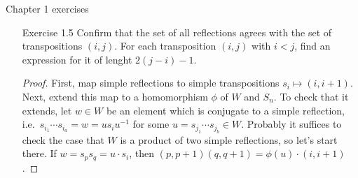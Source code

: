 
Chapter 1 exercises

\begin{enumerate}
    \item[Exercise 1.5] Confirm that the set of all reflections agrees with the set of transpositions $(i,j)$. For each transposition $(i,j)$ with $i<j$, find an expression for it of lenght $2(j-i) - 1$.
    
    \begin{proof}
    First, map simple reflections to simple transpositions $s_i \mapsto (i,i+1)$. 
    Next, extend this map to a homomorphism $\phi$ of $W$ and $S_n$. To check that it extends, let $w\in W$ be an element which is conjugate to a simple reflection, i.e.\ $s_{i_1}\cdots s_{i_a} = w = u s_i u^{-1}$ for some $u = s_{j_1}\cdots s_{j_b}\in W$. Probably it suffices to check the case that $W$ is a product of two simple reflections, so let's start there. If $w = s_p s_q = u\cdot s_i$, then $(p,p+1)(q,q+1)=\phi(u)\cdot (i,i+1)$. 
    \end{proof}
\end{enumerate}